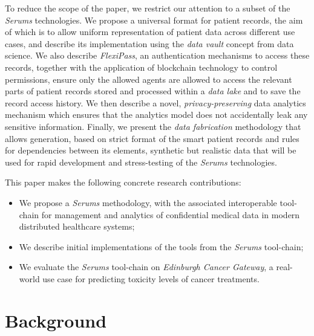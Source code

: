 To reduce the scope of the paper, we restrict our attention to a subset of the \emph{Serums} technologies. We propose a universal format for patient records, the aim of which is to allow uniform representation of patient data across different use cases, and describe its implementation using the \emph{data vault} concept from data science. We also describe \emph{FlexiPass}, an authentication mechanisms to access these records, together with the application of blockchain technology to control permissions, ensure only the allowed agents are allowed to access the relevant parts of patient records stored and processed within a \emph{data lake} and to save the record access history. We then describe a novel, \emph{privacy-preserving} data analytics mechanism which ensures that the analytics model does not accidentally leak any sensitive information. Finally, we present the \emph{data fabrication} methodology that allows generation, based on strict format of the smart patient records and rules for dependencies between its elements, synthetic but realistic data that will be used for rapid development and stress-testing of the \emph{Serums} technologies.


This paper makes the following concrete research contributions: 
\begin{itemize}
    \item We propose a \emph{Serums} methodology, with the associated interoperable tool-chain for management and analytics of confidential medical data in modern distributed healthcare systems;
    \item We describe initial implementations of the tools from the \emph{Serums} tool-chain;
    \item We evaluate the \emph{Serums} tool-chain on \emph{Edinburgh Cancer Gateway}, a real-world use case for predicting toxicity levels of cancer treatments. 
\end{itemize}


\section{Background}

